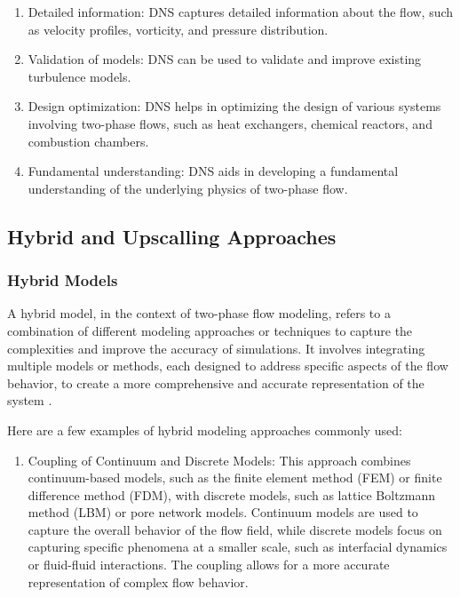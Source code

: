 {\begin{enumerate}
			\item Detailed information: DNS captures detailed information about the flow, such as velocity profiles, vorticity, and pressure distribution.
			
			\item Validation of models: DNS can be used to validate and improve existing turbulence models.
			
			\item Design optimization: DNS helps in optimizing the design of various systems involving two-phase flows, such as heat exchangers, chemical reactors, and combustion chambers.
			
			\item Fundamental understanding: DNS aids in developing a fundamental understanding of the underlying physics of two-phase flow.
			
		\end{enumerate}
			 
\subsection{Hybrid and Upscalling Approaches}
	\subsubsection{Hybrid Models}
		A hybrid model, in the context of two-phase flow modeling, refers to a combination of different modeling approaches or techniques to capture the complexities and improve the accuracy of simulations. It involves integrating multiple models or methods, each designed to address specific aspects of the flow behavior, to create a more comprehensive and accurate representation of the system \cite{rabbani2018pore}.

		Here are a few examples of hybrid modeling approaches commonly used:
		
		\begin{enumerate}
			\item Coupling of Continuum and Discrete Models: This approach combines continuum-based models, such as the finite element method (FEM) or finite difference method (FDM), with discrete models, such as lattice Boltzmann method (LBM) or pore network models. Continuum models are used to capture the overall behavior of the flow field, while discrete models focus on capturing specific phenomena at a smaller scale, such as interfacial dynamics or fluid-fluid interactions. The coupling allows for a more accurate representation of complex flow behavior.
			

\end{enumerate}}
